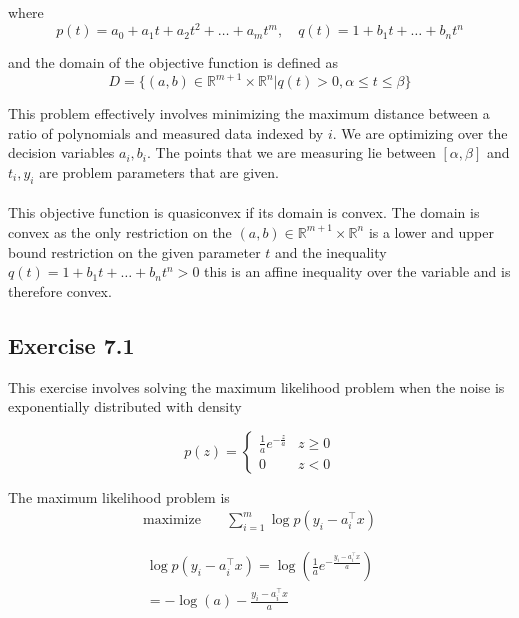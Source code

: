 where
\begin{equation}
    p(t) = a_0 + a_1 t + a_2 t^2 + \dots + a_m t^m, \quad q(t) = 1 + b_1 t + \dots + b_n t^n 
\end{equation}

and the domain of the objective function is defined as
\begin{equation}
    D = \{ (a,b) \in \mathbb{R}^{m+1} \times \mathbb{R}^n | q(t) > 0, \alpha \leq t \leq  \beta \}
\end{equation}

This problem effectively involves minimizing the maximum distance between a ratio of polynomials and measured data indexed by $i$. We are optimizing over the decision variables $a_i, b_i$. The points that we are measuring lie between $[\alpha, \beta]$ and $t_i, y_i$ are problem parameters that are given.
\\ \\
This objective function is quasiconvex if its domain is convex. The domain is convex as the only restriction on the $(a,b) \in \mathbb{R}^{m+1} \times \mathbb{R}^n$ is a lower and upper bound restriction on the given parameter $t$ and the inequality $q(t) = 1 + b_1 t + \dots + b_n t^n > 0$ this is an affine inequality over the variable and is therefore convex.
\\

\subsection{Exercise 7.1}
This exercise involves solving the maximum likelihood problem when the noise is exponentially distributed with density

\begin{equation}
    p(z) = 
    \begin{cases}
        \frac{1}{a} e^{-\frac{z}{a}} & z \geq 0 \\
        0 & z < 0
    \end{cases}
\end{equation}

The maximum likelihood problem is 
\begin{align}
  \text{maximize} & \quad \sum_{i=1}^m \log p(y_i - a_i^\top x)
\end{align}

\begin{gather}
   \log p(y_i - a_i^\top x) = \log (\frac{1}{a} e^{-\frac{y_i - a_i^\top x}{a}}) \\
   = -\log (a) -\frac{y_i - a_i^\top x}{a}
\end{gather}

